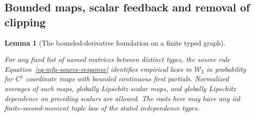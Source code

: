 \documentclass[
  11pt,
]{article}
\theoremstyle{definition}
\theoremstyle{plain}
\theoremstyle{plain}
\theoremstyle{plain}
\newtheorem{lemma}{Lemma}[section]
\theoremstyle{remark}
\begin{document}
\subsection{Bounded maps, scalar feedback and removal of
clipping}\label{sec-mfp-clipping-proof}

\begin{lemma}[The bounded-derivative foundation on a finite typed
graph]\protect\hypertarget{lem-mfp-bounded-typed-extension}{}\label{lem-mfp-bounded-typed-extension}

For any fixed list of named matrices between distinct types, the source
rule Equation~\ref{eq-mfp-source-response} identifies empirical laws in
\(\mathcal W_2\) in probability for \(C^1\) coordinate maps with bounded
continuous first partials. Normalized averages of such maps, globally
Lipschitz scalar maps, and globally Lipschitz dependence on preceding
scalars are allowed. The roots here may have any iid
finite-second-moment tuple law of the stated independence types.

\end{lemma}

\protect{}\label{proof-mfp-bounded-typed-extension}{}
\end{document}
